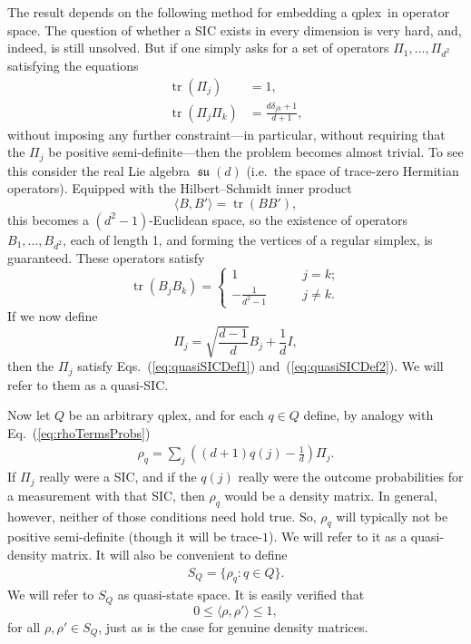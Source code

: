 \documentclass[aps,pra,superscriptaddress,10pt,tightenlines,twocolumn,nofootinbib]{revtex4}
\theoremstyle{remark}
\newcommand{\be}{\begin{equation}}
\newcommand{\ee}{\end{equation}}
\newcommand{\ea}[1]{\begin{align}#1\end{align}}
\newcommand{\la}{\langle}
\newcommand{\ra}{\rangle}
\newcommand{\qp}{Q}
\newcommand{\qplex}{qplex}
\DeclareMathOperator{\Tr}{tr}
\DeclareMathOperator{\su}{\mathfrak{su}}
\begin{document}
The result depends on the following method for embedding a \qplex\ in operator space.  The question of whether a SIC exists in every dimension is very hard, and, indeed, is still unsolved.  But if one simply asks for a set of operators $\Pi_1, \dots , \Pi_{d^2}$ satisfying the equations
\ea{
\Tr(\Pi_j) &= 1,
\label{eq:quasiSICDef1}
\\
\Tr(\Pi_j \Pi_k) & = \frac{d\delta_{jk} +1}{d+1},
\label{eq:quasiSICDef2}
}
without imposing any further constraint---in particular,
without requiring that the $\Pi_j$ be positive semi-definite---then the problem becomes almost trivial.  To see this consider the real Lie algebra $\su(d)$ (i.e.\ the space of trace-zero Hermitian operators).  Equipped with the Hilbert--Schmidt inner product
\be
\la B, B'\ra  = \Tr(B B'),
\ee
this becomes a $(d^2-1)$-Euclidean space, so the existence of operators $B_1,\dots, B_{d^2}$, each of length 1, and forming the vertices of a regular simplex, is guaranteed.  These operators satisfy
\be
\Tr(B_j B_k)
=
\begin{cases}
1 \qquad & j=k;\\
-\frac{1}{d^2-1} \qquad & j\neq k.
\end{cases}
\ee
If we now define
\be
\Pi_j =\sqrt{\frac{d-1}{d}} B_j + \frac{1}{d} I,
\ee
then the $\Pi_j$ satisfy Eqs.~(\ref{eq:quasiSICDef1}) and~(\ref{eq:quasiSICDef2}).  We will refer to them as a quasi-SIC.

Now let $\qp$ be an arbitrary \qplex, and for each $q\in \qp$ define, by analogy with Eq.~(\ref{eq:rhoTermsProbs})
\ea{
\rho_q = \sum_j \left( (d+1) q(j) -\frac{1}{d}\right) \Pi_j.
}
If $\Pi_j$ really were a SIC, and if the $q(j)$ really were the outcome probabilities for a measurement with that SIC, then $\rho_q$ would be a density matrix. In general, however, neither of those conditions need hold true.  So, $\rho_q$ will typically not be positive semi-definite (though it will be trace-$1$).  We will refer to it as a quasi-density matrix.  It will also be convenient to define
\ea{
S_\qp = \{\rho_q\colon q \in \qp\}.
}
We will refer to $S_\qp$ as quasi-state space.
It is easily verified that
\be
0 \le \la \rho, \rho' \ra \le 1,
\label{eq:UrungleichungForQuasiStSp}
\ee
for all $\rho, \rho' \in S_\qp$, just as is the case for genuine density matrices.
\end{document}
